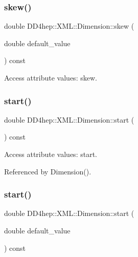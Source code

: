 \subsubsection{\texorpdfstring{skew()}{skew()}\hspace{0.1cm}{\footnotesize\ttfamily [2/2]}}
{\footnotesize\ttfamily double D\+D4hep\+::\+X\+M\+L\+::\+Dimension\+::skew (\begin{DoxyParamCaption}\item[{double}]{default\+\_\+value }\end{DoxyParamCaption}) const}



Access attribute values\+: skew. 

\hypertarget{struct_d_d4hep_1_1_x_m_l_1_1_dimension_a41440e4961276f75dff4c836baaf65af}{}\label{struct_d_d4hep_1_1_x_m_l_1_1_dimension_a41440e4961276f75dff4c836baaf65af} 
\subsubsection{\texorpdfstring{start()}{start()}\hspace{0.1cm}{\footnotesize\ttfamily [1/2]}}
{\footnotesize\ttfamily double D\+D4hep\+::\+X\+M\+L\+::\+Dimension\+::start (\begin{DoxyParamCaption}{ }\end{DoxyParamCaption}) const}



Access attribute values\+: start. 



Referenced by Dimension().

\hypertarget{struct_d_d4hep_1_1_x_m_l_1_1_dimension_a8d84727b50bdd1f1341681d4b310b176}{}\label{struct_d_d4hep_1_1_x_m_l_1_1_dimension_a8d84727b50bdd1f1341681d4b310b176} 
\subsubsection{\texorpdfstring{start()}{start()}\hspace{0.1cm}{\footnotesize\ttfamily [2/2]}}
{\footnotesize\ttfamily double D\+D4hep\+::\+X\+M\+L\+::\+Dimension\+::start (\begin{DoxyParamCaption}\item[{double}]{default\+\_\+value }\end{DoxyParamCaption}) const}




